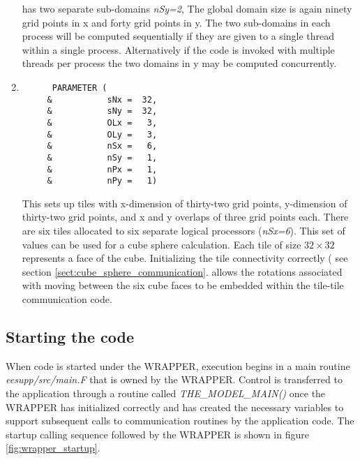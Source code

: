 \begin{enumerate}
has two separate sub-domains {\em nSy=2},
The global domain size is again ninety grid points in x and
forty grid points in y. The two sub-domains in each process will be computed 
sequentially if they are given to a single thread within a single process.
Alternatively if the code is invoked with multiple threads per process
the two domains in y may be computed concurrently.
\item
\begin{verbatim}
      PARAMETER (
     &           sNx =  32,
     &           sNy =  32,
     &           OLx =   3,
     &           OLy =   3,
     &           nSx =   6,
     &           nSy =   1,
     &           nPx =   1,
     &           nPy =   1)
\end{verbatim}
This sets up tiles with x-dimension of thirty-two grid points, y-dimension of
thirty-two grid points, and x and y overlaps of three grid points each. 
There are six tiles allocated to six separate logical processors ({\em nSx=6}).
This set of values can be used for a cube sphere calculation.
Each tile of size $32 \times 32$ represents a face of the
cube. Initializing the tile connectivity correctly ( see section
\ref{sect:cube_sphere_communication}. allows the rotations associated with
moving between the six cube faces to be embedded within the 
tile-tile communication code.
\end{enumerate}


\subsection{Starting the code}
\label{sect:starting_the_code}
When code is started under the WRAPPER, execution begins in a main routine {\em
eesupp/src/main.F} that is owned by the WRAPPER. Control is transferred 
to the application through a routine called {\em THE\_MODEL\_MAIN()}
once the WRAPPER has initialized correctly and has created the necessary variables
to support subsequent calls to communication routines
by the application code. The startup calling sequence followed by the 
WRAPPER is shown in figure \ref{fig:wrapper_startup}.

